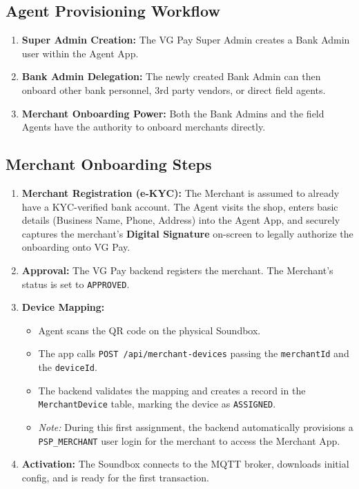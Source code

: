 \documentclass[11pt,a4paper]{article}
\begin{document}
\subsection{Agent Provisioning Workflow}
\begin{enumerate}
    \item \textbf{Super Admin Creation:} The VG Pay Super Admin creates a Bank Admin user within the Agent App.
    \item \textbf{Bank Admin Delegation:} The newly created Bank Admin can then onboard other bank personnel, 3rd party vendors, or direct field agents.
    \item \textbf{Merchant Onboarding Power:} Both the Bank Admins and the field Agents have the authority to onboard merchants directly.
\end{enumerate}

\subsection{Merchant Onboarding Steps}
\begin{enumerate}
    \item \textbf{Merchant Registration (e-KYC):} The Merchant is assumed to already have a KYC-verified bank account. The Agent visits the shop, enters basic details (Business Name, Phone, Address) into the Agent App, and securely captures the merchant's \textbf{Digital Signature} on-screen to legally authorize the onboarding onto VG Pay.
    \item \textbf{Approval:} The VG Pay backend registers the merchant. The Merchant's status is set to \texttt{APPROVED}.
    \item \textbf{Device Mapping:}
    \begin{itemize}
        \item Agent scans the QR code on the physical Soundbox.
        \item The app calls \texttt{POST /api/\allowbreak merchant-devices} passing the \texttt{merchantId} and the \texttt{deviceId}.
        \item The backend validates the mapping and creates a record in the \texttt{MerchantDevice} table, marking the device as \texttt{ASSIGNED}.
        \item \textit{Note:} During this first assignment, the backend automatically provisions a \texttt{PSP\_\allowbreak MERCHANT} user login for the merchant to access the Merchant App.
    \end{itemize}
    \item \textbf{Activation:} The Soundbox connects to the MQTT broker, downloads initial config, and is ready for the first transaction.
\end{enumerate}
\end{document}
